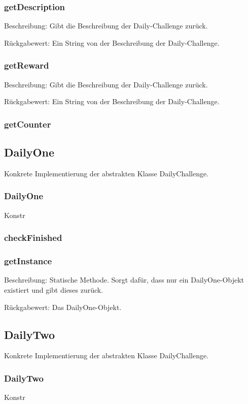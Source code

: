 \documentclass[a4paper]{scrreprt}
\begin{document}
   \subsubsection{getDescription}
     \item Beschreibung: Gibt die Beschreibung der Daily-Challenge zurück.
     \item Rückgabewert: Ein String von der Beschreibung der Daily-Challenge.
   \subsubsection{getReward}
   \item Beschreibung: Gibt die Beschreibung der Daily-Challenge zurück.
   \item Rückgabewert: Ein String von der Beschreibung der Daily-Challenge.
   \subsubsection{getCounter}
   
   \subsection{DailyOne}
   Konkrete Implementierung der abstrakten Klasse DailyChallenge.
   \subsubsection{DailyOne}
   Konstr
   \subsubsection{checkFinished}
   \subsubsection{getInstance}
   \item Beschreibung: Statische Methode. Sorgt dafür, dass nur ein DailyOne-Objekt existiert und gibt dieses zurück.
   \item Rückgabewert: Das DailyOne-Objekt.
   
   \subsection{DailyTwo}
   Konkrete Implementierung der abstrakten Klasse DailyChallenge.
   \subsubsection{DailyTwo}
   Konstr
\end{document}
